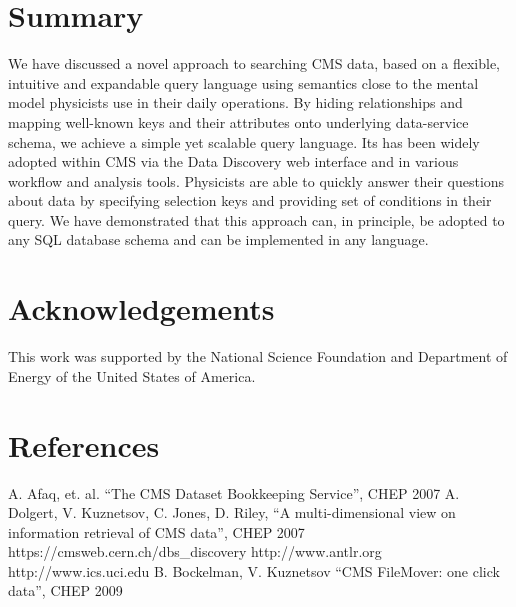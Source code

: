 \documentclass[a4paper]{jpconf}
\begin{document}
\section{Summary}
We have discussed a novel approach to searching CMS data,
based on a flexible,
intuitive and expandable query language using
semantics close to the mental model physicists use in their 
daily operations.
By hiding relationships and mapping well-known
keys and their attributes onto underlying data-service
schema, we achieve a simple yet scalable query language. Its 
has been widely adopted within CMS via the Data Discovery web interface and
in various workflow and analysis tools. Physicists
are able to quickly answer their questions about data by
specifying selection keys and providing set of conditions
in their query. We have demonstrated that this approach
can, in principle, be adopted to any SQL database schema and can be implemented
in any language.

\section{Acknowledgements}

This work was supported by the National Science Foundation and Department of Energy of the United States of America.

\section*{References}
\begin{thebibliography}{9}
 A. Afaq, et. al. ``The CMS Dataset Bookkeeping Service'', CHEP 2007 
 A. Dolgert, V. Kuznetsov, C. Jones, D. Riley, 
``A multi-dimensional view on information retrieval of CMS data'', CHEP 2007
 https://cmsweb.cern.ch/dbs\_discovery
 http://www.antlr.org
 http://www.ics.uci.edu
 B. Bockelman, V. Kuznetsov ``CMS FileMover: one click data'', CHEP 2009

\end{thebibliography}
\end{document}

